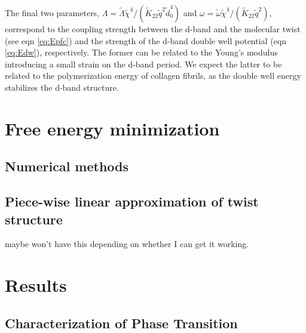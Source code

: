 \documentclass[%
 reprint,
 amsmath,amssymb,
 aps,
]{revtex4-1}
\begin{document}
The final two parameters, $\Lambda=\tilde{\Lambda}\tilde{\chi}^4/(\tilde{K}_{22}\tilde{q}^2\tilde{d}_0^4)$ and $\omega=\tilde{\omega}\tilde{\chi}^4/(\tilde{K}_{22}\tilde{q}^2)$, correspond to the coupling strength between the d-band and the molecular twist (see eqn \ref{eq:Epfc}) and the strength of the d-band double well potential (eqn \ref{eq:Edw}), respectively. The former can be related to the Young's modulus introducing a small strain on the d-band period. We expect the latter to be related to the polymerization energy of collagen fibrils, as the double well energy stabilizes the d-band structure.

\section{\label{sec:methods}Free energy minimization}
\subsection{\label{sub:numerical}Numerical methods}
\subsection{\label{sub:piecewise}Piece-wise linear approximation of twist structure}
maybe won't have this depending on whether I can get it working.
\section{\label{sec:results}Results}

\subsection{\label{sub:phasetransition}Characterization of Phase Transition}

\end{document}
